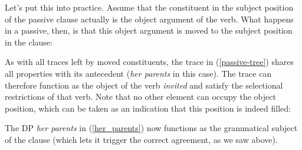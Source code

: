 \documentclass{article}
\begin{document}
Let's put this into practice. Assume that the constituent in the subject position of the passive clause actually is the object argument of the verb.
What happens in a passive, then, is that this object argument is moved to the subject position in the clause:
\begin{exe}
    \label{passive-tree}
\end{exe}
\vspace{-2em}
As with all traces left by moved constituents, the trace in (\ref{passive-tree}) shares all properties with its antecedent (\emph{her parents} in this case).
The trace can therefore function as the object of the verb \emph{invited} and satisfy the selectional restrictions of that verb.
Note that no other element can occupy the object position, which can be taken as an indication that this position is indeed filled:
\begin{exe}
    \label{her_parents}
\end{exe}

The DP \emph{her parents} in (\ref{her_parents}) now functions as the grammatical subject of the clause (which lets it trigger the correct agreement, as we saw above).
\end{document}
